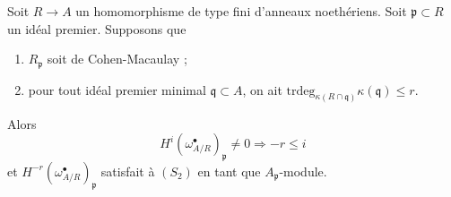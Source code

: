 \begin{lemma}
\label{lemma-relative-dualizing-CM-vanishing}
Soit $R \to A$ un homomorphisme de type fini d'anneaux noethériens.
Soit $\mathfrak p \subset R$ un idéal premier. Supposons que
\begin{enumerate}
\item $R_\mathfrak p$ soit de Cohen-Macaulay ;
\item pour tout idéal premier minimal $\mathfrak q \subset A$, on ait $\text{trdeg}_{\kappa(R \cap \mathfrak q)} \kappa(\mathfrak q) \leq r$.
\end{enumerate}
Alors
$$
H^i(\omega_{A/R}^\bullet)_\mathfrak p \not = 0 \Rightarrow - r \leq i
$$
et $H^{-r}(\omega_{A/R}^\bullet)_\mathfrak p$ satisfait à $(S_2)$ en tant que $A_\mathfrak p$-module.
\end{lemma}

